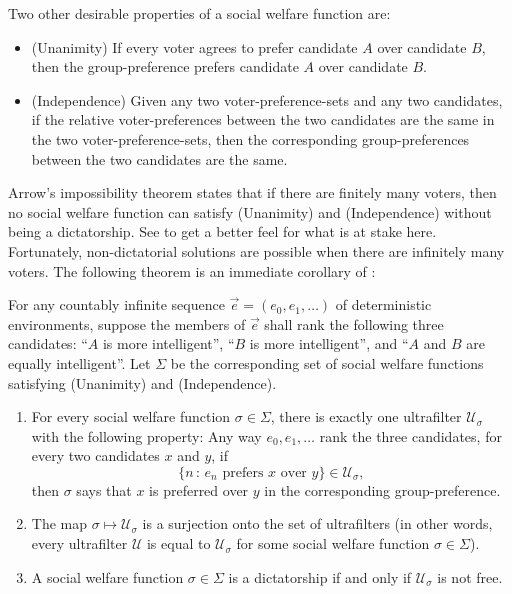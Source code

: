 \documentclass[twoside,11pt]{article}
\begin{document}
Two other desirable properties of a social welfare function are:
\begin{itemize}
    \item
    (Unanimity)
    If every voter agrees to prefer candidate $A$ over candidate $B$, then
    the group-preference prefers candidate $A$ over candidate $B$.
    \item
    (Independence)
    Given any two voter-preference-sets and any
    two candidates, if the relative voter-preferences
    between the two candidates are the same in the two voter-preference-sets, then the
    corresponding group-preferences between the two candidates are the same.
\end{itemize}
Arrow's impossibility theorem states that if there are finitely many voters, then
no social welfare function can satisfy (Unanimity) and (Independence) without being
a dictatorship. See \citet{encyclopedia}
to get a better feel for what is at stake here.
Fortunately, non-dictatorial solutions are possible when there are infinitely many
voters.
The following theorem is an immediate corollary of \citet{kirman}:

\begin{theorem}
\label{shoulderofgiants}
    For any countably infinite
    sequence $\vec{e}=(e_0,e_1,\ldots)$ of deterministic environments, suppose the
    members of $\vec{e}$
    shall rank the following three candidates: ``$A$ is more intelligent'',
    ``$B$ is more intelligent'', and ``$A$ and $B$ are equally intelligent''.
    Let $\Sigma$ be the corresponding set of social welfare functions satisfying
    (Unanimity) and (Independence).
    \begin{enumerate}
        \item
        For every social welfare function $\sigma\in\Sigma$, there is exactly one
        ultrafilter $\mathscr U_\sigma$ with the following property:
        Any way $e_0,e_1,\ldots$ rank the three candidates, for every two candidates
        $x$ and $y$,
        if
        \[
            \{n\,:\,\mbox{$e_n$ prefers $x$ over $y$}\} \in \mathscr U_\sigma,
        \]
        then $\sigma$ says that $x$ is preferred
        over $y$ in the corresponding group-preference.
        \item
        The map $\sigma\mapsto \mathscr U_\sigma$ is a surjection onto the set of ultrafilters
        (in other words, every ultrafilter $\mathscr U$ is equal to $\mathscr U_\sigma$ for
        some social welfare function $\sigma\in\Sigma$).
        \item
        A social welfare function $\sigma\in\Sigma$ is a dictatorship if and only if
        $\mathscr U_\sigma$ is not free.
    \end{enumerate}
\end{theorem}
\end{document}
